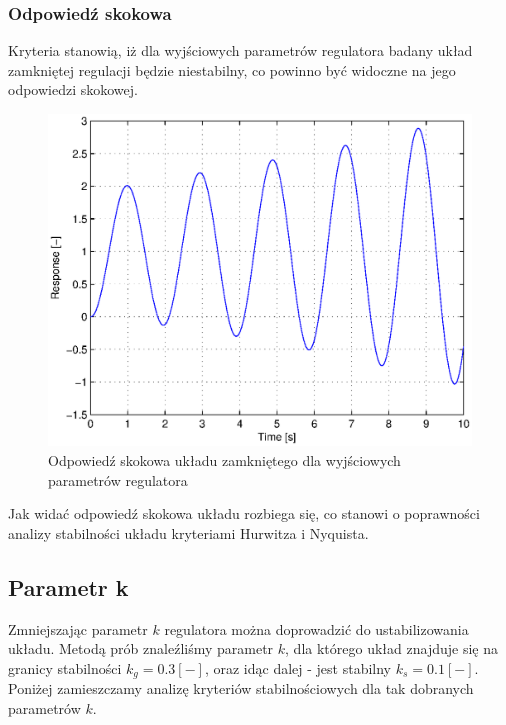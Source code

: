 \documentclass[12pt]{article}
\begin{document}
\newpage

\subsubsection{Odpowiedź skokowa}

Kryteria stanowią, iż dla wyjściowych parametrów regulatora badany układ
zamkniętej regulacji będzie niestabilny, co powinno być widoczne na jego
odpowiedzi skokowej.

\begin{figure}[!htb]
	\begin{center}
		\includegraphics[width=15cm]{../res/img/2-1-0,5_resp.eps} 
	\end{center}
	\caption{Odpowiedź skokowa układu zamkniętego dla wyjściowych parametrów
	regulatora}
\end{figure}

Jak widać odpowiedź skokowa układu rozbiega się, co stanowi o poprawności
analizy stabilności układu kryteriami Hurwitza i Nyquista.








\newpage

\subsection{Parametr k}

Zmniejszając parametr $k$ regulatora można doprowadzić do ustabilizowania
układu. Metodą prób znaleźliśmy parametr $k$, dla którego układ znajduje się na
granicy stabilności $k_g=0.3[-]$, oraz idąc dalej - jest stabilny $k_s=0.1[-]$.
Poniżej zamieszczamy analizę kryteriów stabilnościowych dla tak dobranych
parametrów $k$.
\end{document}
